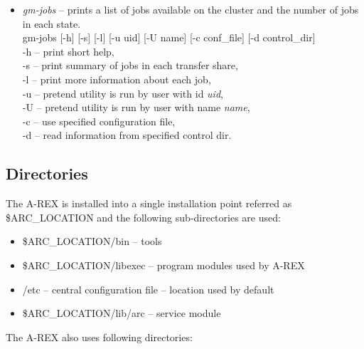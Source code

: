 \documentclass{article}                            %
\begin{document}
\begin{itemize}
\item \textit{gm-jobs} -- prints a list of jobs available on the cluster
and the number of jobs in each state.\\
\hspace*{0.5cm}gm-jobs {[}-h] {[}-s] {[}-l] {[}-u uid] {[}-U name] {[}-c conf\_file] {[}-d control\_dir]\\
\hspace*{0.5cm}-h -- print short help,\\
\hspace*{0.5cm}-s -- print summary of jobs in each transfer share,\\
\hspace*{0.5cm}-l -- print more information about each job,\\
\hspace*{0.5cm}-u -- pretend utility is run by user with id \emph{uid},\\
\hspace*{0.5cm}-U -- pretend utility is run by user with name \emph{name},\\
\hspace*{0.5cm}-c -- use specified configuration file,\\
\hspace*{0.5cm}-d -- read information from specified control dir.
\end{itemize}


\subsection{Directories}

The A-REX is installed into a single installation point referred as
\$ARC\_LOCATION and the following sub-directories are used:

\begin{itemize}
\item[] \$ARC\_LOCATION/bin -- tools
\item[] \$ARC\_LOCATION/libexec -- program modules used by A-REX
\item[] /etc -- central configuration file -- location used by default
\item[] \$ARC\_LOCATION/lib/arc -- service module
\end{itemize}

The A-REX also uses following directories:
\end{document}
